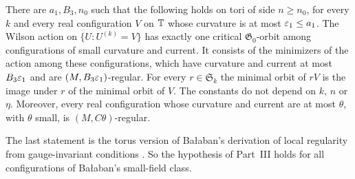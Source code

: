 \begin{maintheorem}\label{thm:J}
There are $a_1,B_3,n_0$ such that the following holds on tori of side $n\ge n_0$, for every $k$ and every real configuration $V$ on $\mathbb T$ whose curvature is at most $\varepsilon_1\le a_1$. The Wilson action on $\{U:U^{(k)}=V\}$ has exactly one critical $\mathfrak G_0$-orbit among configurations of small curvature and current. It consists of the minimizers of the action among these configurations, which have curvature and current at most $B_3\varepsilon_1$ and are $(M,B_3\varepsilon_1)$-regular. For every $r\in\mathfrak S_k$ the minimal orbit of $rV$ is the image under $r$ of the minimal orbit of $V$. The constants do not depend on $k$, $n$ or $\eta$. Moreover, every real configuration whose curvature and current are at most $\theta$, with $\theta$ small, is $(M,C\theta)$-regular.
\end{maintheorem}

The last statement is the torus version of Ba\l aban's derivation of local regularity from gauge-invariant conditions \cite[Sect.~F]{BalReg}. So the hypothesis of Part~III holds for all configurations of Ba\l aban's small-field class.

